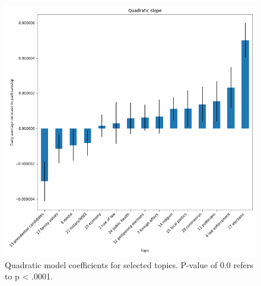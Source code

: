 \documentclass{article}
\begin{document}
	\begin{figure}[!h]
		\centering
		\includegraphics[width=\columnwidth]{figures/partisanship_topics_coef_quadratic.png}
		\caption{Quadratic model coefficients for selected topics. P-value of 0.0 refers to p < .0001.}
		\label{fig:partisanship_topics_coef_quadratic}
	\end{figure}

\clearpage
\end{document}

